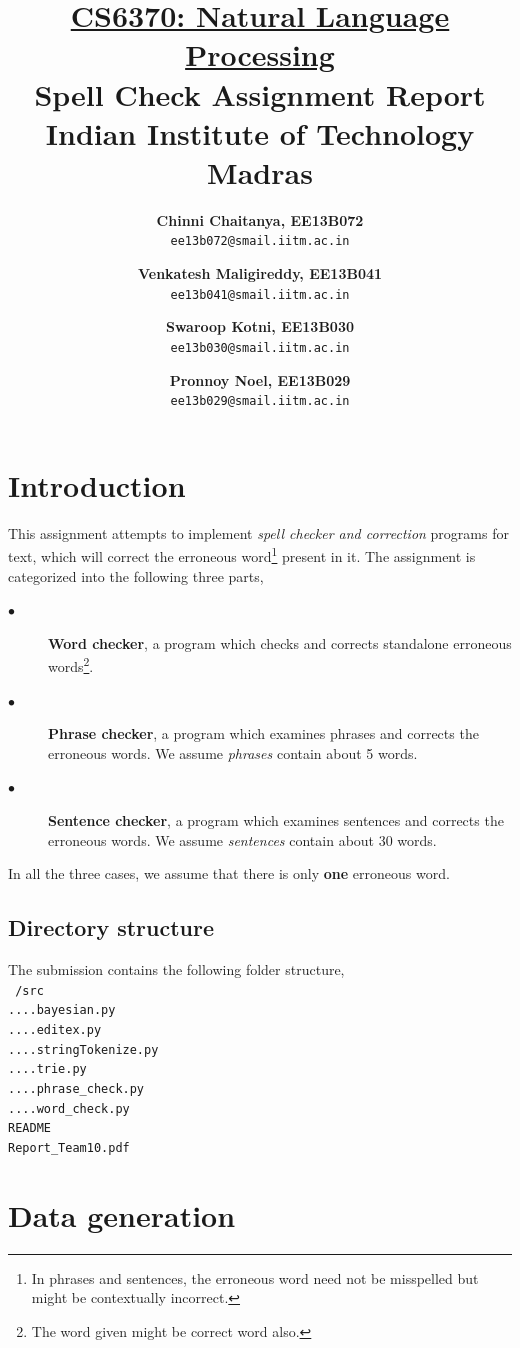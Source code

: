 \documentclass{article}
\title{
	\underline{CS6370: Natural Language Processing}\\
	\textbf{Spell Check Assignment Report}\\
	Indian Institute of Technology Madras
}
\author{
	\textbf{Chinni Chaitanya, EE13B072}\\
	\texttt{ee13b072@smail.iitm.ac.in}	
	\and
	\textbf{Venkatesh Maligireddy, EE13B041}\\
	\texttt{ee13b041@smail.iitm.ac.in}
	\and
	\textbf{Swaroop Kotni, EE13B030}\\
	\texttt{ee13b030@smail.iitm.ac.in}
	\and
	\textbf{Pronnoy Noel, EE13B029}\\
	\texttt{ee13b029@smail.iitm.ac.in}
}
\begin{document}
	\maketitle
	\newpage
	
	\tableofcontents
	\newpage
	
	\section{Introduction}
		This assignment attempts to implement \textit{spell checker and correction} programs for text, which will correct the erroneous word\footnote{In phrases and sentences, the erroneous word need not be misspelled but might be contextually incorrect.} present in it. The assignment is categorized into the following three parts,
		\begin{description}
			\item[$\bullet$] \textbf{Word checker}, a program which checks and corrects standalone erroneous words\footnote{The word given might be correct word also.}.
			\item[$\bullet$] \textbf{Phrase checker}, a program which examines phrases and corrects the erroneous words. We assume \textit{phrases} contain about 5 words.
			\item[$\bullet$] \textbf{Sentence checker}, a program which examines sentences and corrects the erroneous words. We assume \textit{sentences} contain about 30 words.
		\end{description}
		In all the three cases, we assume that there is only \textbf{one} erroneous word.
		\subsection{Directory structure}
			The submission contains the following folder structure,\\
			\texttt{
				/src\\
				....bayesian.py\\
				....editex.py\\
				....stringTokenize.py\\
				....trie.py\\
				....phrase\_check.py\\
				....word\_check.py\\
				README\\
				Report\_Team10.pdf
			}
		
	\section{Data generation}
\end{document}
